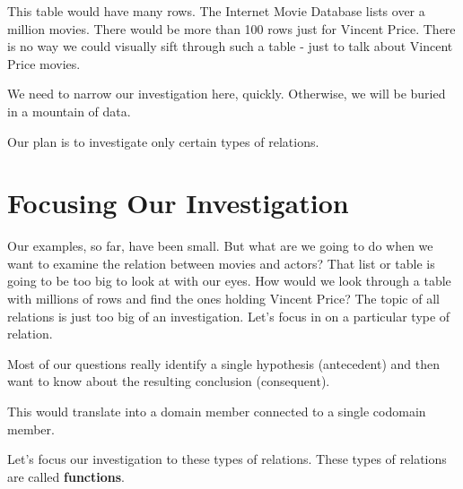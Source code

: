 \documentclass{ximera}
\begin{document}
This table would have many rows. The Internet Movie Database lists over a million movies.  There would be more than 100 rows just for Vincent Price. There is no way we could visually sift through such a table - just to talk about Vincent Price movies.

We need to narrow our investigation here, quickly. Otherwise, we will be buried in a mountain of data.

Our plan is to investigate only certain types of relations.








\section{Focusing Our Investigation}


Our examples, so far, have been small.  But what are we going to do when we want to examine the relation between movies and actors?  That list or table is going to be too big to look at with our eyes.  How would we look through a table with millions of rows and find the ones holding Vincent Price?  The topic of all relations is just too big of an investigation. Let's focus in on a particular type of relation.

Most of our questions really identify a single hypothesis (antecedent) and then want to know about the resulting conclusion (consequent).

This would translate into a domain member connected to a single codomain member.

Let's focus our investigation to these types of relations.  These types of relations are called \textbf{functions}.
\end{document}
